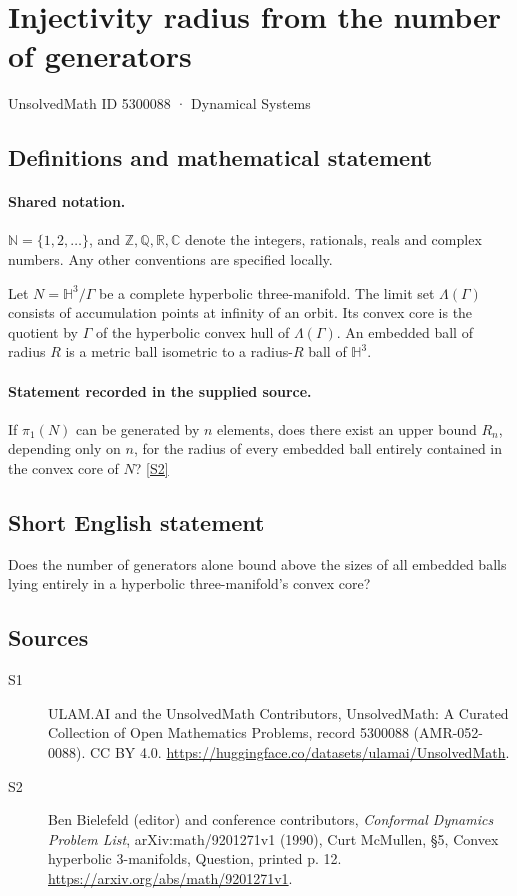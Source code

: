 \documentclass[11pt]{article}
\newcommand{\sref}[2]{\hyperlink{source:#1:#2}{[S#2]}}
\begin{document}
\setcounter{section}{5300087}
\section{Injectivity radius from the number of generators}\label{5300088}
{\small\sffamily UnsolvedMath ID 5300088 · Dynamical Systems}
\subsection{Definitions and mathematical statement}

\paragraph{Shared notation.}$\mathbb N=\{1,2,\ldots\}$, and $\mathbb Z,\mathbb Q,\mathbb R,\mathbb C$ denote the integers, rationals, reals and complex numbers. Any other conventions are specified locally.


Let $N=\mathbb H^3/\Gamma$ be a complete hyperbolic three-manifold. The limit set $\Lambda(\Gamma)$ consists of accumulation points at infinity of an orbit. Its convex core is the quotient by $\Gamma$ of the hyperbolic convex hull of $\Lambda(\Gamma)$. An embedded ball of radius $R$ is a metric ball isometric to a radius-$R$ ball of $\mathbb H^3$.
\paragraph{Statement recorded in the supplied source.}
If $\pi_1(N)$ can be generated by $n$ elements, does there exist an upper bound $R_n$, depending only on $n$, for the radius of every embedded ball entirely contained in the convex core of $N$? \sref{5300088}{2}
\subsection{Short English statement}
Does the number of generators alone bound above the sizes of all embedded balls lying entirely in a hyperbolic three-manifold’s convex core?
\subsection{Sources}
\begin{description}
\item[\hypertarget{source:5300088:1}{S1}] ULAM.AI and the UnsolvedMath Contributors, UnsolvedMath: A Curated Collection of Open Mathematics Problems, record 5300088 (AMR-052-0088). CC BY 4.0. \url{https://huggingface.co/datasets/ulamai/UnsolvedMath}.
\item[\hypertarget{source:5300088:2}{S2}] Ben Bielefeld (editor) and conference contributors, \emph{Conformal Dynamics Problem List}, arXiv:math/9201271v1 (1990), Curt McMullen, \S5, Convex hyperbolic 3-manifolds, Question, printed p. 12. \url{https://arxiv.org/abs/math/9201271v1}.
\end{description}
\label{end:5300088}
\end{document}
